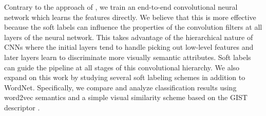 Contrary to the approach of \cite{zhao2011large}, we train an end-to-end
convolutional neural network which learns the features directly.
We believe that this is more effective because the soft labels can influence
the properties of the convolution filters at all layers of the neural network.
This takes advantage of the hierarchical nature of CNNs where the initial
layers tend to handle picking out low-level features and later layers learn to
discriminate more visually semantic attributes. Soft labels can guide the
pipeline at all stages of this convolutional hierarchy.
We also expand on this work by studying several soft labeling schemes in
addition to WordNet. Specifically, we compare and analyze classification
results using word2vec semantics and a simple visual similarity scheme based on
the GIST descriptor \cite{oliva2001modeling}.
